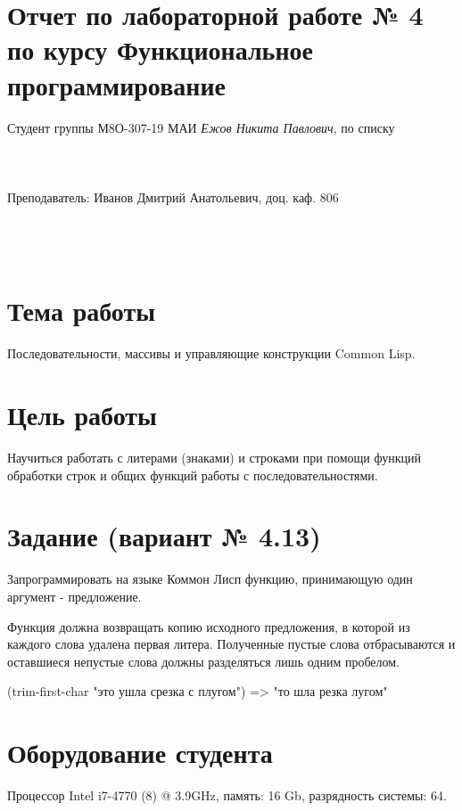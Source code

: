 \documentclass[12pt]{article}
\begin{document}
\section*{Отчет по лабораторной работе № 4 \\
по курсу \guillemotleft Функциональное программирование\guillemotright}
\begin{flushright}
Студент группы М8О-307-19 МАИ \textit{Ежов Никита Павлович},  по списку \\
 \\
 \\
\ \\
Преподаватель: Иванов Дмитрий Анатольевич, доц. каф. 806 \\
 \\
 \\
 \\

\end{flushright}

\section{Тема работы}
Последовательности, массивы и управляющие конструкции Common Lisp.

\section{Цель работы}
Научиться работать с литерами (знаками) и строками при помощи функций обработки строк и общих функций работы с последовательностями.

\section{Задание (вариант № 4.13)}
Запрограммировать на языке Коммон Лисп функцию, принимающую один аргумент - предложение.

Функция должна возвращать копию исходного предложения, в которой из каждого слова удалена первая литера. Полученные пустые слова отбрасываются и оставшиеся непустые слова должны разделяться лишь одним пробелом.

(trim-first-char "это  ушла срезка  с плугом") => "то шла резка лугом"

\section{Оборудование студента}
Процессор Intel i7-4770 (8) @ 3.9GHz, память: 16 Gb, разрядность системы: 64.
\end{document}

